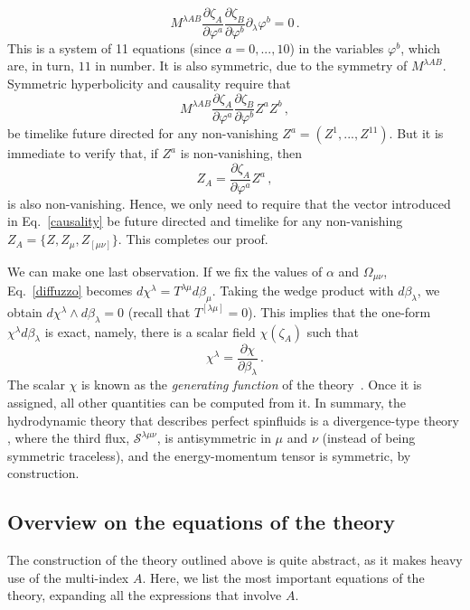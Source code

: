 \documentclass[12pt,aps,prd,nofootinbib,noshowkeys,noshowpacs,longbibliography,
superscriptaddress,tightenlines,floatfix,preprintnumbers]{revtex4-2}
\begin{document}
\begin{equation}
    M^{\lambda A B} \dfrac{\partial \zeta_A}{\partial \varphi^a} \dfrac{\partial \zeta_B}{\partial \varphi^b}\partial_\lambda \varphi^b=0 \, .
\end{equation}
This is a system of 11 equations (since $a=0,...,10$) in the variables $\varphi^b$, which are, in turn, $11$ in number. It is also symmetric, due to the symmetry of $M^{\lambda AB}$. Symmetric hyperbolicity and causality require that \cite{Geroch_Lindblom_1991_causal}
\begin{equation}
    M^{\lambda A B} \dfrac{\partial \zeta_A}{\partial \varphi^a} \dfrac{\partial \zeta_B}{\partial \varphi^b} Z^a Z^b \,,
\end{equation}
be timelike future directed for any non-vanishing $Z^a=(Z^1,...,Z^{11})$. But it is immediate to verify that, if $Z^a$ is non-vanishing, then 
\begin{equation}
    Z_A= \dfrac{\partial \zeta_A}{\partial \varphi^a} Z^a \, ,
\end{equation}
is also non-vanishing. Hence, we only need to require that the vector introduced in Eq.~\eqref{causality} be future directed and timelike for any non-vanishing $Z_A=\{Z,Z_\mu,Z_{[\mu \nu]}\}$. This completes our proof.

We can make one last observation. If we fix the values of $\alpha$ and $\Omega_{\mu \nu}$, Eq.~\eqref{diffuzzo} becomes $d\chi^\lambda=T^{\lambda \mu}d\beta_\mu$. Taking the wedge product with $d\beta_\lambda$, we obtain $d\chi^\lambda \wedge d\beta_\lambda =0$ (recall that $T^{[\lambda \mu]}=0$). This implies that the one-form $\chi^\lambda d\beta_\lambda$ is exact, namely, there is a scalar field $\chi(\zeta_A)$ such that
\begin{equation}
    \chi^\lambda = \dfrac{\partial \chi}{\partial \beta_\lambda} \, .
\end{equation}
The scalar $\chi$ is known as the \emph{generating function} of the theory~\cite{GerochLindblom1990}.
Once it is assigned, all other quantities can be computed from it. In summary, the hydrodynamic theory that describes perfect spinfluids is a divergence-type theory \cite{Liu1986}, where the third flux,  $\mathcal{S}^{\lambda \mu \nu}$, is antisymmetric in $\mu$ and $\nu$ (instead of being symmetric traceless), and the energy-momentum tensor is symmetric, by construction.
%
\subsection{Overview on the equations of the theory}
\label{subsec:overview_EOM}
%
The construction of the theory outlined above is quite abstract, as it makes heavy use of the multi-index $A$. Here, we list the most important equations of the theory, expanding all the expressions that involve $A$.
\end{document}
